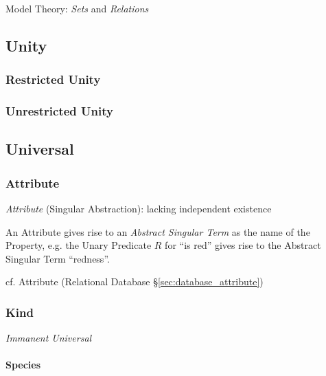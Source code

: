 Model Theory: \emph{Sets} and \emph{Relations}



\subsection{Unity}\label{sec:unity}

\subsubsection{Restricted Unity}\label{sec:restricted_unity}

\subsubsection{Unrestricted Unity}\label{sec:unrestricted_unity}



\subsection{Universal}\label{sec:universal}

\subsubsection{Attribute}\label{sec:attribute}

\emph{Attribute} (Singular Abstraction): lacking independent existence

An Attribute gives rise to an \emph{Abstract Singular Term} as the name
of the Property, e.g. the Unary Predicate $R$ for ``is red'' gives
rise to the Abstract Singular Term ``redness''. \cite{laycock10}

\fist cf. Attribute (Relational Database \S\ref{sec:database_attribute})



\subsubsection{Kind}\label{sec:universal_kind}

\emph{Immanent Universal}



\paragraph{Species}\label{sec:species}\hfill

